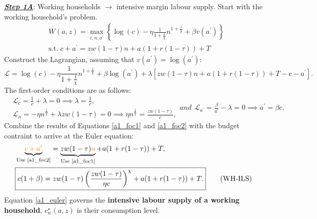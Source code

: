 \colorbox{Gray!25}{\textbf{\textit{\underline{Step 1A}}}: Working households $\to$ intensive margin labour supply.}
Start with the working household's problem.
\begin{equation}
    \begin{aligned}
    &W(a, z)  = \max _{c, n, a^{\prime}} \left\{ \log (c)-\eta \frac{1}{1+\frac{1}{\chi}} n^{1+\frac{1}{\chi}}+\beta v\left(a^{\prime}\right)\right\} \\
    &\text {s.t.} \;  c+a^{\prime}=z w(1-\tau) n+a(1+r(1-\tau))+T
\end{aligned}
\end{equation}
Construct the Lagrangian, assuming that $v\left(a^{\prime}\right)=\log\left(a^{\prime}\right)$:
\begin{equation}
    \mathcal{L}=\log (c)-\eta \frac{1}{1+\frac{1}{\chi}} n^{1+\frac{1}{\chi}}+\beta \log \left(a^{\prime}\right)+\lambda \left[z w(1-\tau) n+a(1+r(1-\tau))+T-c-a^{\prime} \right].
\end{equation}
The first-order conditions are as follows:
\begin{subequations}
    \begin{align}
        & \mathcal{L}_c= \frac{1}{c}+\lambda=0 \implies \lambda = \frac{1}{c}, \\
        & \mathcal{L}_n = -\eta n^{\frac{1}{\chi}}+\lambda zw (1-\tau)=0 \implies \eta n^{\frac{1}{\chi}}=\frac{zw (1-\tau)}{c}, \label{a1_foc1}
    \end{align}
    and 
    \begin{align}
        \mathcal{L}_{a^\prime}=\frac{\beta}{a^\prime}-\lambda =0 \implies a^\prime = \beta c.\label{a1_foc2}
    \end{align}
\end{subequations}
Combine the results of Equations \eqref{a1_foc1} and \eqref{a1_foc2} with the budget contraint to arrive at the Euler equation:
\begin{subequations}
    \begin{align}
        &  \underbrace{ \textcolor{BurntOrange}{c+a^{\prime}}}_{\text{Use \eqref{a1_foc2}}}=\underbrace{z w(1-\tau) \textcolor{BurntOrange}{n}}_{\text{Use \eqref{a1_foc1}}}+a(1+r(1-\tau))+T, \\
        &  \boxed{c(1+\beta)=z w(1-\tau) \left( \frac{z w(1-\tau)}{\eta c}\right)^\chi +a(1+r(1-\tau))+T.} \tag{WH-ILS}\label{a1_euler} 
    \end{align}
\end{subequations}
Equation \eqref{a1_euler} governs the \textcolor{BurntOrange}{\textbf{intensive labour supply of a working household}},  
 $c_w^\star (a,z)$ is their consumption level.\\ 

